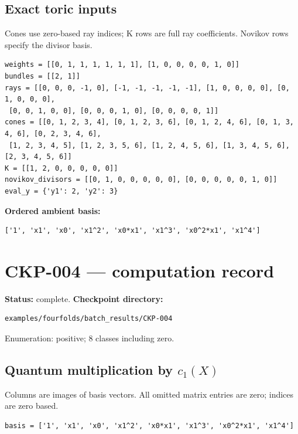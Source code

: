 \documentclass[10pt,a4paper]{article}
\begin{document}
\subsection*{Exact toric inputs}
Cones use zero-based ray indices; K rows are full ray coefficients. Novikov rows specify the divisor basis.

\begin{lstlisting}
weights = [[0, 1, 1, 1, 1, 1, 1], [1, 0, 0, 0, 0, 1, 0]]
bundles = [[2, 1]]
rays = [[0, 0, 0, -1, 0], [-1, -1, -1, -1, -1], [1, 0, 0, 0, 0], [0, 1, 0, 0, 0],
 [0, 0, 1, 0, 0], [0, 0, 0, 1, 0], [0, 0, 0, 0, 1]]
cones = [[0, 1, 2, 3, 4], [0, 1, 2, 3, 6], [0, 1, 2, 4, 6], [0, 1, 3, 4, 6], [0, 2, 3, 4, 6],
 [1, 2, 3, 4, 5], [1, 2, 3, 5, 6], [1, 2, 4, 5, 6], [1, 3, 4, 5, 6], [2, 3, 4, 5, 6]]
K = [[1, 2, 0, 0, 0, 0, 0]]
novikov_divisors = [[0, 1, 0, 0, 0, 0, 0], [0, 0, 0, 0, 0, 1, 0]]
eval_y = {'y1': 2, 'y2': 3}
\end{lstlisting}

\textbf{Ordered ambient basis:}
\begin{lstlisting}
['1', 'x1', 'x0', 'x1^2', 'x0*x1', 'x1^3', 'x0^2*x1', 'x1^4']
\end{lstlisting}

\clearpage\section*{CKP-004 --- computation record}
\textbf{Status:} complete.
\textbf{Checkpoint directory:}
\begin{lstlisting}
examples/fourfolds/batch_results/CKP-004
\end{lstlisting}

Enumeration: positive; 8 classes including zero.
\subsection*{Quantum multiplication by $c_1(X)$}
Columns are images of basis vectors. All omitted matrix entries are zero; indices are zero based.

\begin{lstlisting}
basis = ['1', 'x1', 'x0', 'x1^2', 'x0*x1', 'x1^3', 'x0^2*x1', 'x1^4']
\end{lstlisting}
\end{document}
